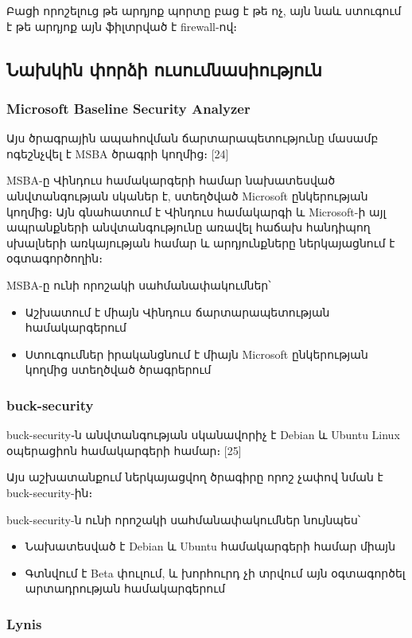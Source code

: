 \documentclass[10pt]{article}
\begin{document}
\begin{sloppypar}
Բացի որոշելուց թե արդյոք պորտը բաց է թե ոչ, այն նաև ստուգում է
թե արդյոք այն ֆիլտրված է firewall-ով։


\subsection{Նախկին փորձի ուսումնասիություն}


\subsubsection{Microsoft Baseline Security Analyzer}


Այս ծրագրային ապահովման ճարտարապետությունը մասամբ ոգեշնչվել է
MSBA ծրագրի կողմից։ [24]

MSBA-ը Վինդուս համակարգերի համար նախատեսված անվտանգության սկաներ է,
ստեղծված Microsoft ընկերության կողմից։ Այն գնահատում է Վինդուս
համակարգի և Microsoft-ի այլ ապրանքների անվտանգությունը առավել
հաճախ հանդիպող սխալների առկայության համար և արդյունքները 
ներկայացնում է օգտագործողին։

MSBA-ը ունի որոշակի սահմանափակումներ՝
\begin{itemize}
\item Աշխատում է միայն Վինդուս ճարտարապետության համակարգերում
\item Ստուգումներ իրականցնում է միայն Microsoft ընկերության
	կողմից ստեղծված ծրագրերում
\end{itemize}


\subsubsection{buck-security}


buck-security֊ն անվտանգության սկանավորիչ է Debian և Ubuntu Linux
օպերացիոն համակարգերի համար։ [25]

Այս աշխատանքում ներկայացվող ծրագիրը որոշ չափով նման է buck-security-ին։

buck-security-ն ունի որոշակի սահմանափակումներ նույնպես՝
\begin{itemize}
\item Նախատեսված է Debian և Ubuntu համակարգերի համար միայն
\item Գտնվում է Beta փուլում, և խորհուրդ չի տրվում այն օգտագործել
	արտադրության համակարգերում
\end{itemize}


\subsubsection{Lynis}



\end{sloppypar}
\end{document}
